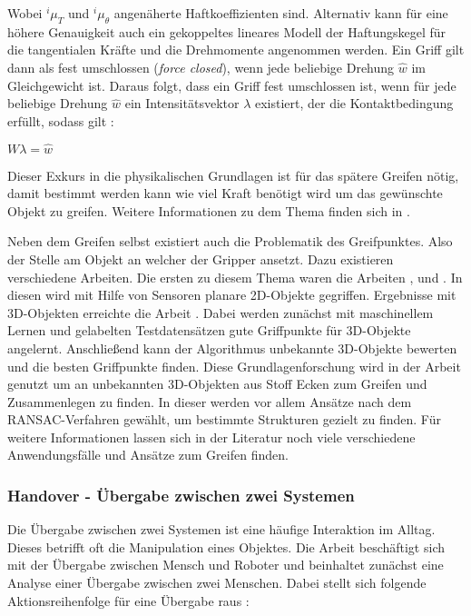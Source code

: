 Wobei $^i\mu_T$ und $^i\mu_\theta$ angenäherte Haftkoeffizienten sind. Alternativ kann für eine höhere Genauigkeit auch ein gekoppeltes lineares Modell der Haftungskegel für die tangentialen Kräfte und die Drehmomente angenommen werden.\cite{bicchi1993experimental} Ein Griff gilt dann als fest umschlossen (\textit{force closed}), wenn jede beliebige Drehung $\hat{w}$ im Gleichgewicht ist. Daraus folgt, dass ein Griff fest umschlossen ist, wenn für jede beliebige Drehung $\hat{w}$ ein Intensitätsvektor $\lambda$ existiert, der die Kontaktbedingung erfüllt, sodass gilt \cite{nguyen1988constructing}:

\begin{math}
	W\lambda = \hat{w}
\end{math}

Dieser Exkurs in die physikalischen Grundlagen ist für das spätere Greifen nötig, damit bestimmt werden kann wie viel Kraft benötigt wird um das gewünschte Objekt zu greifen. Weitere Informationen zu dem Thema finden sich in \cite{bicchi2000robotic}.

Neben dem Greifen selbst existiert auch die Problematik des Greifpunktes. Also der Stelle am Objekt an welcher der Gripper ansetzt. Dazu existieren verschiedene Arbeiten. Die ersten zu diesem Thema waren die Arbeiten \cite{kamon1996learning}, \cite{coelho2001developing} und \cite{bowers2003manipulation}. In diesen wird mit Hilfe von Sensoren planare 2D-Objekte gegriffen. Ergebnisse mit 3D-Objekten erreichte die Arbeit \cite{saxena2008robotic}. Dabei werden zunächst mit maschinellem Lernen und gelabelten Testdatensätzen gute Griffpunkte für 3D-Objekte angelernt. Anschließend kann der Algorithmus unbekannte 3D-Objekte bewerten und die besten Griffpunkte finden. Diese Grundlagenforschung wird in der Arbeit \cite{maitin2010cloth} genutzt um an unbekannten 3D-Objekten aus Stoff Ecken zum Greifen und Zusammenlegen zu finden. In dieser werden vor allem Ansätze nach dem RANSAC-Verfahren gewählt, um bestimmte Strukturen gezielt zu finden. Für weitere Informationen lassen sich in der Literatur noch viele verschiedene Anwendungsfälle und Ansätze zum Greifen finden.

\subsubsection{Handover - Übergabe zwischen zwei Systemen}
Die Übergabe zwischen zwei Systemen ist eine häufige Interaktion im Alltag. Dieses betrifft oft die Manipulation eines Objektes. Die Arbeit \cite{huber2008human} beschäftigt sich mit der Übergabe zwischen Mensch und Roboter und beinhaltet zunächst eine Analyse einer Übergabe zwischen zwei Menschen. Dabei stellt sich folgende Aktionsreihenfolge für eine Übergabe raus \cite{huber2008human}:

